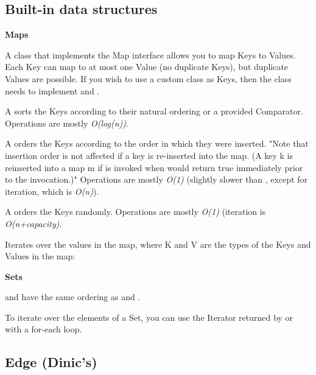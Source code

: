
\subsection*{Built-in data structures}

\textbf{Maps}

A class that implements the Map interface allows you to map Keys to Values. Each Key can map to at most one Value (no duplicate Keys), but duplicate Values are possible. If you wish to use a custom class as Keys, then the class needs to implement  and .

A  sorts the Keys according to their natural ordering or a provided Comparator. Operations are mostly \textit{O(log(n))}.

A  orders the Keys according to the order in which they were inserted. "Note that insertion order is not affected if a key is re-inserted into the map. (A key k is reinserted into a map m if  is invoked when  would return true immediately prior to the invocation.)" Operations are mostly \textit{O(1)} (slightly slower than , except for iteration, which is \textit{O(n)}).

A  orders the Keys randomly. Operations are mostly \textit{O(1)} (iteration is \textit{O(n+capacity)}.

Iterates over the values in the map, where K and V are the types of the Keys and Values in the map:




\textbf{Sets}

 and  have the same ordering as  and .

To iterate over the elements of a Set, you can use the Iterator returned by  or with a for-each loop.

\subsection*{Edge (Dinic's)}



\newpage
